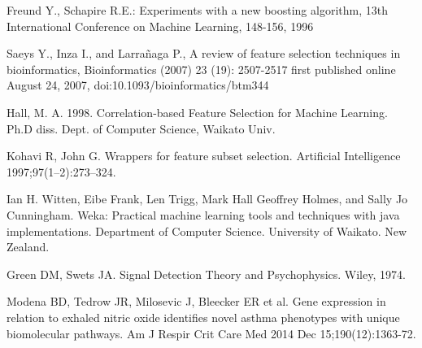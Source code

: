 \documentclass[conference,a4paper]{IEEEtran}
\begin{document}
\begin{thebibliography}{1}
	 Freund Y., Schapire R.E.: Experiments with a new boosting algorithm, 13th International Conference on Machine Learning, 148-156, 1996
	
	 Saeys Y., Inza I., and Larra\~naga P., A review of feature selection techniques in bioinformatics, Bioinformatics (2007) 23 (19): 2507-2517 first published online August 24, 2007, doi:10.1093/bioinformatics/btm344
	
	 Hall, M. A. 1998. Correlation-based Feature Selection for Machine Learning. Ph.D diss. Dept. of Computer Science, Waikato Univ.
	
	Kohavi R, John G. Wrappers for feature subset selection. Artificial Intelligence 1997;97(1–2):273–324.
	
	 Ian H. Witten, Eibe Frank, Len Trigg, Mark Hall Geoffrey Holmes, and Sally Jo Cunningham. Weka: Practical machine learning tools and techniques with java implementations. Department of Computer Science. University of Waikato. New Zealand.
	
	 Green DM, Swets JA. Signal Detection Theory and Psychophysics. Wiley, 1974.
	
	 Modena BD, Tedrow JR, Milosevic J, Bleecker ER et al. Gene expression in relation to exhaled nitric oxide identifies novel asthma phenotypes with unique biomolecular pathways. Am J Respir Crit Care Med 2014 Dec 15;190(12):1363-72.
	
	
\end{thebibliography}
\end{document}
